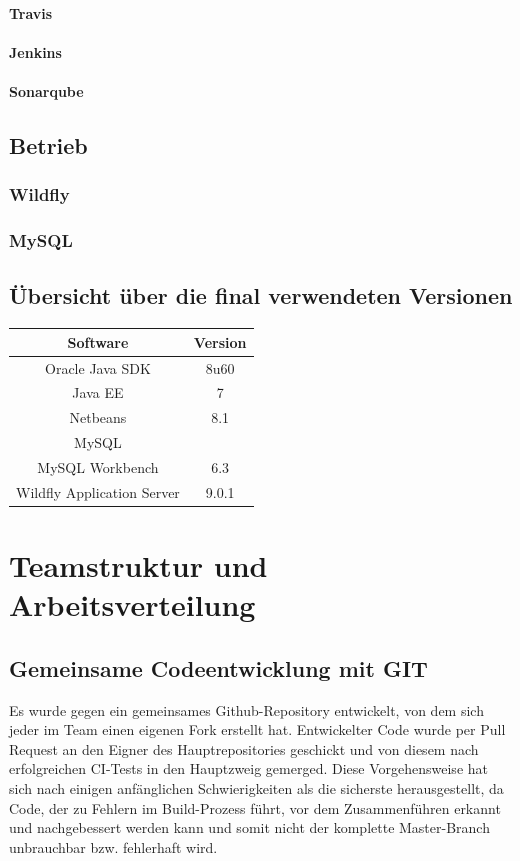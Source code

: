 \documentclass[12pt,a4paper,parskip]{scrreprt}
\begin{document}
\subsubsection{Travis}
\subsubsection{Jenkins}
\subsubsection{Sonarqube}
\section{Betrieb}
\subsection{Wildfly}
\subsection{MySQL}
\section{Übersicht über die final verwendeten Versionen}
\begin{center}
\begin{tabular}{|c|c|}
\hline
\rule[-1ex]{0pt}{2.5ex} Software & Version  \\ 
\hline 
\rule[-1ex]{0pt}{2.5ex} Oracle Java SDK & 8u60  \\ 
\hline 
\rule[-1ex]{0pt}{2.5ex} Java EE & 7 \\ 
\hline 
\rule[-1ex]{0pt}{2.5ex} Netbeans & 8.1 \\ 
\hline 
\rule[-1ex]{0pt}{2.5ex} MySQL &  \\ 
\hline 
\rule[-1ex]{0pt}{2.5ex} MySQL Workbench & 6.3 \\ 
\hline
\rule[-1ex]{0pt}{2.5ex} Wildfly Application Server & 9.0.1 \\ 
\hline 
\end{tabular}
\end{center}
\chapter{Teamstruktur und Arbeitsverteilung}
\section{Gemeinsame Codeentwicklung mit GIT}
Es wurde gegen ein gemeinsames Github-Repository entwickelt, von dem sich jeder im Team einen eigenen Fork erstellt hat. Entwickelter Code wurde per Pull Request an den Eigner des Hauptrepositories geschickt und von diesem nach erfolgreichen CI-Tests in den Hauptzweig gemerged. Diese Vorgehensweise hat sich nach einigen anfänglichen Schwierigkeiten als die sicherste herausgestellt, da Code, der zu Fehlern im Build-Prozess führt, vor dem Zusammenführen erkannt und nachgebessert werden kann und somit nicht der komplette Master-Branch unbrauchbar bzw. fehlerhaft wird.
\end{document}
